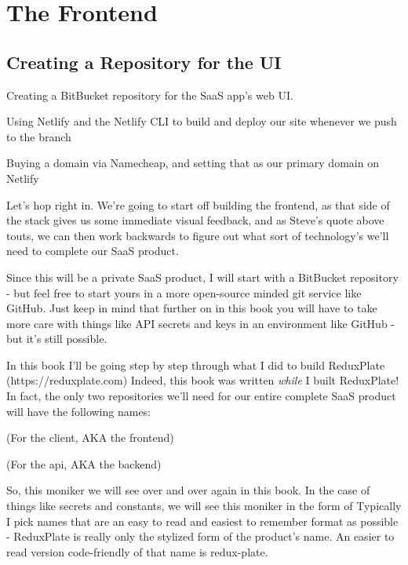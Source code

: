 \documentclass[a4paper,
                             oneside,
                             BCOR1.0cm,
                             DIV11,
                             parskip=full,
                             11pt]{scrbook}
\newcommand\novaimatge{\texttt{[image: write]}}
\begin{document}
\chapter{The Frontend}\label{cap:primer}

\section{Creating a Repository for the UI}\label{sec:titles}

\begin{bclogo}[logo=\novaimatge,couleur=gray!30,barre=none,noborder=true,marge=10,ombre=true,couleurOmbre=black!60,blur]%
    {}
    \sffamily\scriptsize
    \begin{arrows}
    \item Creating a BitBucket  repository for the SaaS app's web UI.
    \item Using Netlify and the Netlify CLI to build and deploy our site whenever we push to the  branch
    \item Buying a domain via Namecheap, and setting that as our primary domain on Netlify
    \end{arrows}
    \end{bclogo}

Let's hop right in. We're going to start off building the frontend, as that side of the stack gives us some immediate visual feedback, and as Steve's quote above touts, we can then work backwards to figure out what sort of technology's we'll need to complete our SaaS product. 

Since this will be a private SaaS product, I will start with a BitBucket repository - but feel free to start yours in a more open-source minded git service like GitHub. Just keep in mind that further on in this book you will have to take more care with things like API secrets and keys in an environment like GitHub - but it's still possible.


In this book I'll be going step by step through what I did to build ReduxPlate (https://reduxplate.com) Indeed, this book was written \textit{while} I built ReduxPlate! In fact, the only two repositories we'll need for our entire complete SaaS product will have the following names:

 (For the client, AKA the frontend)

 (For the api, AKA the backend)

So, this \codeword{} moniker we will see over and over again in this book. In the case of things like secrets and constants, we will see this moniker in the form of  Typically I pick names that are an easy to read and easiest to remember format as possible - ReduxPlate is really only the stylized form of the product's name. An easier to read version code-friendly of that name is redux-plate.
\end{document}
